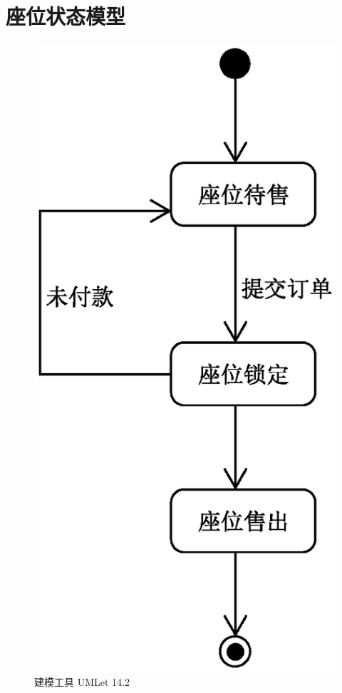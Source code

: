 \documentclass[a4paper]{article}
\begin{document}
  \section{座位状态模型}
    \begin{figure}[H]
      \centering
      \includegraphics{state_seat.eps}
      \caption{建模工具 UMLet 14.2}
    \end{figure}
\end{document}
